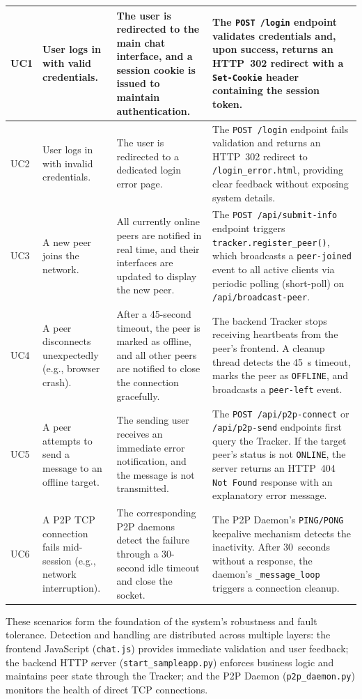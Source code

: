 \begin{longtable}{|p{1cm}|p{3.2cm}|p{4cm}|p{6.4cm}|}
UC1 & User logs in with valid credentials. & The user is redirected to the main chat interface, and a session cookie is issued to maintain authentication. & The \texttt{POST /login} endpoint validates credentials and, upon success, returns an HTTP~302 redirect with a \texttt{Set-Cookie} header containing the session token. \\
\hline
UC2 & User logs in with invalid credentials. & The user is redirected to a dedicated login error page. & The \texttt{POST /login} endpoint fails validation and returns an HTTP~302 redirect to \texttt{/login\_error.html}, providing clear feedback without exposing system details. \\
\hline
UC3 & A new peer joins the network. & All currently online peers are notified in real time, and their interfaces are updated to display the new peer. & The \texttt{POST /api/submit-info} endpoint triggers \texttt{tracker.register\_peer()}, which broadcasts a \texttt{peer-joined} event to all active clients via periodic polling (short-poll) on \texttt{/api/broadcast-peer}. \\
\hline
UC4 & A peer disconnects unexpectedly (e.g., browser crash). & After a 45-second timeout, the peer is marked as offline, and all other peers are notified to close the connection gracefully. & The backend Tracker stops receiving heartbeats from the peer’s frontend. A cleanup thread detects the 45~s timeout, marks the peer as \texttt{OFFLINE}, and broadcasts a \texttt{peer-left} event. \\
\hline
UC5 & A peer attempts to send a message to an offline target. & The sending user receives an immediate error notification, and the message is not transmitted. & The \texttt{POST /api/p2p-connect} or \texttt{/api/p2p-send} endpoints first query the Tracker. If the target peer’s status is not \texttt{ONLINE}, the server returns an HTTP~404 \texttt{Not Found} response with an explanatory error message. \\
\hline
UC6 & A P2P TCP connection fails mid-session (e.g., network interruption). & The corresponding P2P daemons detect the failure through a 30-second idle timeout and close the socket. & The P2P Daemon’s \texttt{PING/PONG} keepalive mechanism detects the inactivity. After 30~seconds without a response, the daemon’s \texttt{\_message\_loop} triggers a connection cleanup. \\

\end{longtable}

These scenarios form the foundation of the system’s robustness and fault tolerance. 
Detection and handling are distributed across multiple layers: the frontend JavaScript (\texttt{chat.js}) provides immediate validation and user feedback; 
the backend HTTP server (\texttt{start\_sampleapp.py}) enforces business logic and maintains peer state through the Tracker; 
and the P2P Daemon (\texttt{p2p\_daemon.py}) monitors the health of direct TCP connections.

